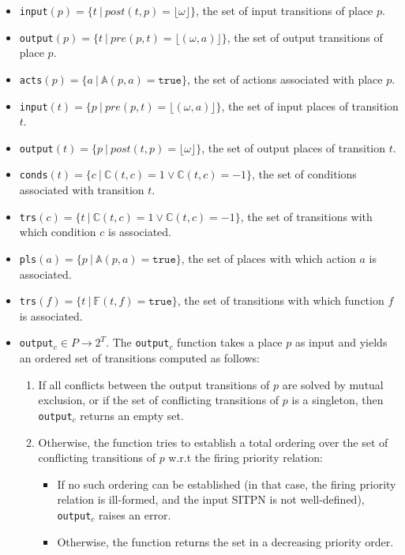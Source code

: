 \begin{itemize}
\item \texttt{input}$(p)=\{t~\vert~post(t,p)=\lfloor\omega\rfloor\}$,
  the set of input transitions of place $p$.
\item
  \texttt{output}$(p)=\{t~\vert~pre(p,t)=\lfloor(\omega,a)\rfloor\}$,
  the set of output transitions of place $p$.

\item \texttt{acts}$(p)=\{a~\vert~\mathbb{A}(p,a)=\mathtt{true}\}$,
  the set of actions associated with place $p$.
\item
  \texttt{input}$(t)=\{p~\vert~pre(p,t)=\lfloor(\omega,a)\rfloor\}$,
  the set of input places of transition $t$.
\item \texttt{output}$(t)=\{p~\vert~post(t,p)=\lfloor\omega\rfloor\}$,
  the set of output places of transition $t$.
\item
  \texttt{conds}$(t)=\{c~\vert~\mathbb{C}(t,c)=1\lor\mathbb{C}(t,c)=-1\}$,
  the set of conditions associated with transition $t$.
\item
  \texttt{trs}$(c)=\{t~\vert~\mathbb{C}(t,c)=1\lor\mathbb{C}(t,c)=-1\}$,
  the set of transitions with which condition $c$ is associated.
\item \texttt{pls}$(a)=\{p~\vert~\mathbb{A}(p,a)=\mathtt{true}\}$, the
  set of places with which action $a$ is associated.
\item \texttt{trs}$(f)=\{t~\vert~\mathbb{F}(t,f)=\mathtt{true}\}$, the
  set of transitions with which function $f$ is associated.
\end{itemize}

\begin{itemize}
\item \texttt{output}$_c\in{}P\rightarrow{}2^T$.  The
  \texttt{output}$_c$ function takes a place $p$ as input and yields
  an ordered set of transitions computed as follows:
  \begin{enumerate}
  \item If all conflicts between the output transitions of $p$ are
    solved by mutual exclusion, or if the set of conflicting
    transitions of $p$ is a singleton, then \texttt{output}$_c$
    returns an empty set.
  \item Otherwise, the function tries to establish a total ordering
    over the set of conflicting transitions of $p$ w.r.t the firing
    priority relation:
    \begin{itemize}
    \item If no such ordering can be established (in that case, the
      firing priority relation is ill-formed, and the input SITPN is
      not well-defined), \texttt{output}$_c$ raises an error.
    \item Otherwise, the function returns the set in a decreasing
      priority order.
    \end{itemize}
  \end{enumerate}
\end{itemize}

